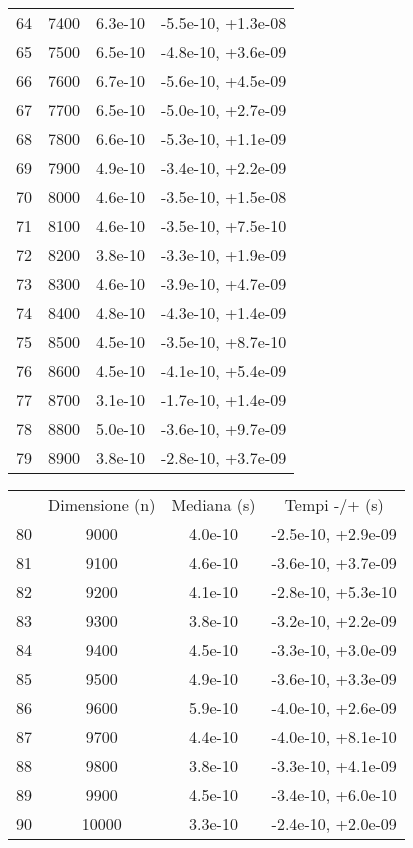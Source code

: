 \begin{table}
\begin{adjustbox}{width=1\textwidth/2}
\begin{tabular}{|c|c|c|c|}
\cline{1-4}
64 & 7400 & 6.3e-10 & -5.5e-10, +1.3e-08 \\
\cline{1-4}
65 & 7500 & 6.5e-10 & -4.8e-10, +3.6e-09 \\
\cline{1-4}
66 & 7600 & 6.7e-10 & -5.6e-10, +4.5e-09 \\
\cline{1-4}
67 & 7700 & 6.5e-10 & -5.0e-10, +2.7e-09 \\
\cline{1-4}
68 & 7800 & 6.6e-10 & -5.3e-10, +1.1e-09 \\
\cline{1-4}
69 & 7900 & 4.9e-10 & -3.4e-10, +2.2e-09 \\
\cline{1-4}
70 & 8000 & 4.6e-10 & -3.5e-10, +1.5e-08 \\
\cline{1-4}
71 & 8100 & 4.6e-10 & -3.5e-10, +7.5e-10 \\
\cline{1-4}
72 & 8200 & 3.8e-10 & -3.3e-10, +1.9e-09 \\
\cline{1-4}
73 & 8300 & 4.6e-10 & -3.9e-10, +4.7e-09 \\
\cline{1-4}
74 & 8400 & 4.8e-10 & -4.3e-10, +1.4e-09 \\
\cline{1-4}
75 & 8500 & 4.5e-10 & -3.5e-10, +8.7e-10 \\
\cline{1-4}
76 & 8600 & 4.5e-10 & -4.1e-10, +5.4e-09 \\
\cline{1-4}
77 & 8700 & 3.1e-10 & -1.7e-10, +1.4e-09 \\
\cline{1-4}
78 & 8800 & 5.0e-10 & -3.6e-10, +9.7e-09 \\
\cline{1-4}
79 & 8900 & 3.8e-10 & -2.8e-10, +3.7e-09 \\
\cline{1-4}
\end{tabular}
\end{adjustbox}
\end{table}

\begin{table}
\centering
\begin{adjustbox}{width=1\textwidth/2}
\begin{tabular}{|c|c|c|c|}
\hline
 & Dimensione (n) & Mediana (s) & Tempi -/+ (s) \\
80 & 9000 & 4.0e-10 & -2.5e-10, +2.9e-09 \\
\cline{1-4}
81 & 9100 & 4.6e-10 & -3.6e-10, +3.7e-09 \\
\cline{1-4}
82 & 9200 & 4.1e-10 & -2.8e-10, +5.3e-10 \\
\cline{1-4}
83 & 9300 & 3.8e-10 & -3.2e-10, +2.2e-09 \\
\cline{1-4}
84 & 9400 & 4.5e-10 & -3.3e-10, +3.0e-09 \\
\cline{1-4}
85 & 9500 & 4.9e-10 & -3.6e-10, +3.3e-09 \\
\cline{1-4}
86 & 9600 & 5.9e-10 & -4.0e-10, +2.6e-09 \\
\cline{1-4}
87 & 9700 & 4.4e-10 & -4.0e-10, +8.1e-10 \\
\cline{1-4}
88 & 9800 & 3.8e-10 & -3.3e-10, +4.1e-09 \\
\cline{1-4}
89 & 9900 & 4.5e-10 & -3.4e-10, +6.0e-10 \\
\cline{1-4}
90 & 10000 & 3.3e-10 & -2.4e-10, +2.0e-09 \\
\cline{1-4}
\end{tabular}
\end{adjustbox}
\end{table}

